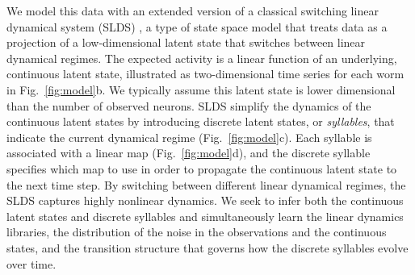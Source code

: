 \documentclass[11pt]{article}
\begin{document}
We model this data with an extended version of a classical switching
linear dynamical system (SLDS) \citep{chang1978state,
  ackerson1970state, hamilton1990analysis, ghahramani1996switching,
  murphy1998switching}, a type of state space model that treats data
as a projection of a low-dimensional latent state that switches
between linear dynamical regimes.  The expected activity is a linear
function of an underlying, continuous latent state, illustrated as
two-dimensional time series for each worm in Fig.~\ref{fig:model}b.
We typically assume this latent state is lower dimensional than the
number of observed neurons. SLDS simplify the dynamics of the
continuous latent states by introducing discrete latent states, or
\emph{syllables}, that indicate the current dynamical regime
(Fig.~\ref{fig:model}c).  Each syllable is associated with a linear
map (Fig.~\ref{fig:model}d), and the discrete syllable specifies which
map to use in order to propagate the continuous latent state to the
next time step.  By switching between different linear dynamical
regimes, the SLDS captures highly nonlinear dynamics.  We seek to
infer both the continuous latent states and discrete syllables and
simultaneously learn the linear dynamics libraries, the distribution
of the noise in the observations and the continuous states, and the
transition structure that governs how the discrete syllables evolve
over time.
\end{document}
